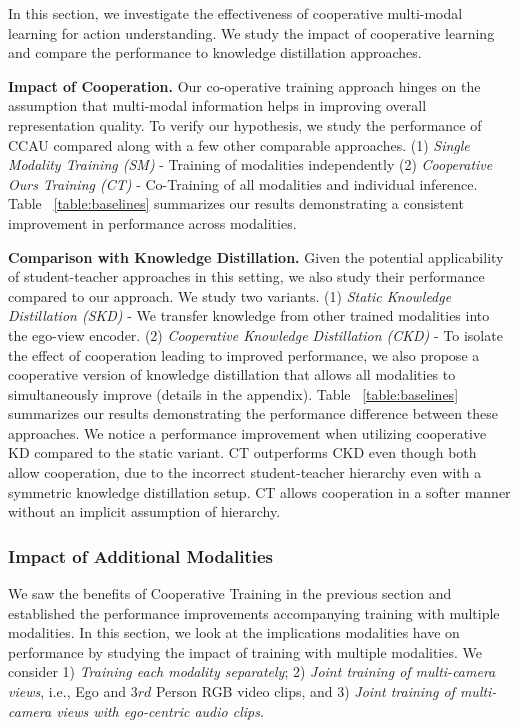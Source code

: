 \documentclass[final]{cvpr}
\begin{document}
In this section, we investigate the effectiveness of cooperative multi-modal learning for action understanding. We study the impact of cooperative learning and compare the performance to knowledge distillation approaches.

\noindent\textbf{Impact of Cooperation.} Our co-operative training approach hinges on the assumption that multi-modal information helps in improving overall representation quality. To verify our hypothesis, we study the performance of CCAU compared along with a few other comparable approaches. {(1) \textit{Single Modality Training (SM)}} - Training of modalities independently {(2) \textit{Cooperative Ours Training (CT)}} - Co-Training of all modalities and individual inference. Table ~\ref{table:baselines} summarizes our results demonstrating a consistent improvement in performance across modalities.

\noindent\textbf{Comparison with Knowledge Distillation.} Given the potential applicability of student-teacher approaches in this setting, we also study their performance compared to our approach. We study two variants. {(1) \textit{Static Knowledge Distillation (SKD)}} - We transfer knowledge from other trained modalities into the ego-view encoder. {(2) \textit{Cooperative Knowledge Distillation (CKD)}} - To isolate the effect of cooperation leading to improved performance, we also propose a cooperative version of knowledge distillation that allows all modalities to simultaneously improve (details in the appendix). Table ~\ref{table:baselines} summarizes our results demonstrating the performance difference between these approaches. We notice a performance improvement when utilizing cooperative KD compared to the static variant. CT outperforms CKD even though both allow cooperation, due to the incorrect student-teacher hierarchy even with a symmetric knowledge distillation setup. CT allows cooperation in a softer manner without an implicit assumption of hierarchy.

\subsubsection{Impact of Additional Modalities}

We saw the benefits of Cooperative Training in the previous section and established the performance improvements accompanying training with multiple modalities. In this section, we look at the implications modalities have on performance by studying the impact of training with multiple modalities. We consider 1) \textit{Training each modality separately}; 2) \textit{Joint training of multi-camera views}, i.e., Ego and $3rd$ Person RGB video clips, and 3) \textit{Joint training of multi-camera views with ego-centric audio clips}.
\end{document}
